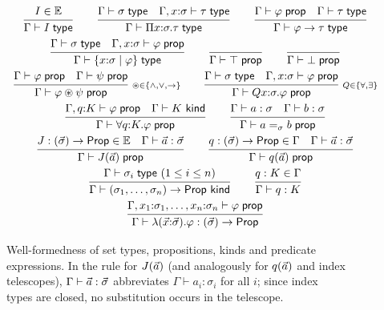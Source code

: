 \begin{figure}[t]
\small
\[
\begin{array}{c}
\rul{I \in \Env}{\Gamma \vdash I \styp}
\qquad
\rul{\Gamma \vdash \sigma \styp \quad \Gamma, x{:}\sigma \vdash \tau \styp}
    {\Gamma \vdash \Pi x{:}\sigma.\tau \styp}
\qquad
\rul{\Gamma \vdash \varphi \sprop \quad \Gamma \vdash \tau \styp}
    {\Gamma \vdash \varphi \to \tau \styp}
\\[2.2ex]
\rul{\Gamma \vdash \sigma \styp \quad \Gamma, x{:}\sigma \vdash \varphi \sprop}
    {\Gamma \vdash \refty{x{:}\sigma}{\varphi} \styp}
\qquad
\rul{}{\Gamma \vdash \top \sprop}
\qquad
\rul{}{\Gamma \vdash \bot \sprop}
\\[2.2ex]
\rul{\Gamma \vdash \varphi \sprop \quad \Gamma \vdash \psi \sprop}
    {\Gamma \vdash \varphi \mathbin{\circledast} \psi \sprop}
\;{\scriptstyle \circledast \in \{\wedge,\vee,\to\}}
\qquad
\rul{\Gamma \vdash \sigma \styp \quad \Gamma, x{:}\sigma \vdash \varphi \sprop}
    {\Gamma \vdash Qx{:}\sigma.\varphi \sprop}
\;{\scriptstyle Q \in \{\forall,\exists\}}
\\[2.2ex]
\rul{\Gamma, q{:}K \vdash \varphi \sprop \quad \Gamma \vdash K\ \mathsf{kind}}
    {\Gamma \vdash \forall q{:}K.\varphi \sprop}
\qquad
\rul{\Gamma \vdash a : \sigma \quad \Gamma \vdash b : \sigma}
    {\Gamma \vdash a =_{\sigma} b \sprop}
\\[2.2ex]
\rul{J : (\tup{\sigma}) \to \Prop \in \Env \quad \Gamma \vdash \tup{a} : \tup{\sigma}}
    {\Gamma \vdash J(\tup{a}) \sprop}
\qquad
\rul{q : (\tup{\sigma}) \to \Prop \in \Gamma \quad \Gamma \vdash \tup{a} : \tup{\sigma}}
    {\Gamma \vdash q(\tup{a}) \sprop}
\\[2.2ex]
\rul{\Gamma \vdash \sigma_i \styp \ (1 \le i \le n)}
    {\Gamma \vdash (\sigma_1,\dots,\sigma_n) \to \Prop\ \mathsf{kind}}
\qquad
\rul{q : K \in \Gamma}{\Gamma \vdash q : K}
\\[2.2ex]
\rul{\Gamma, x_1{:}\sigma_1, \dots, x_n{:}\sigma_n \vdash \varphi \sprop}
    {\Gamma \vdash \lambda(\tup{x}{:}\tup{\sigma}).\varphi : (\tup{\sigma}) \to \Prop}
\end{array}
\]
\caption{Well-formedness of set types, propositions, kinds and predicate
  expressions.  In the rule for $J(\vec{a})$ (and analogously for
  $q(\vec{a})$ and index telescopes), $\Gamma \vdash \vec{a} :
  \vec{\sigma}$ abbreviates $\Gamma \vdash a_i : \sigma_i$ for all $i$;
  since index types are closed, no substitution occurs in the telescope.}
\label{fig:wf}
\end{figure}

